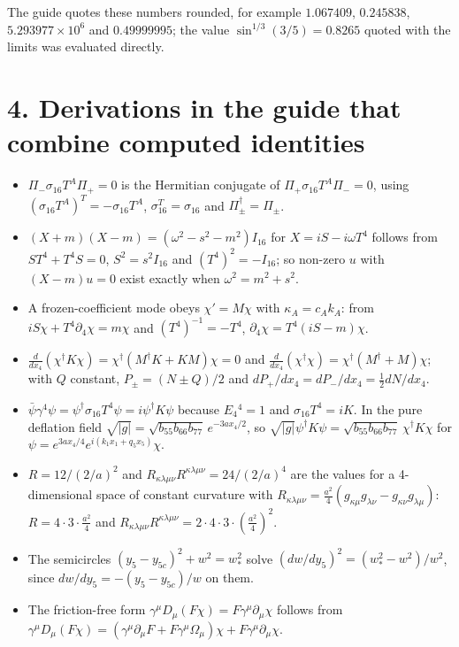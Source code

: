 \documentclass[10pt]{article}
\begin{document}
The guide quotes these numbers rounded, for example $1.067409$, $0.245838$, $5.293977\times10^6$ and $0.49999995$; the value $\sin^{1/3}(3/5) = 0.8265$ quoted with the limits was evaluated directly.


\section*{4. Derivations in the guide that combine computed identities}

\begin{itemize}
\item $\Pi_-\sigma_{16}T^A\Pi_+ = 0$ is the Hermitian conjugate of $\Pi_+\sigma_{16}T^A\Pi_- = 0$, using $(\sigma_{16}T^A)^T = -\sigma_{16}T^A$, $\sigma_{16}^T = \sigma_{16}$ and $\Pi_\pm^\dagger = \Pi_\pm$.
\item $(X + m)(X - m) = (\omega^2 - s^2 - m^2)I_{16}$ for $X = iS - i\omega T^4$ follows from $ST^4 + T^4S = 0$, $S^2 = s^2I_{16}$ and $(T^4)^2 = -I_{16}$; so non-zero $u$ with $(X - m)u = 0$ exist exactly when $\omega^2 = m^2 + s^2$.
\item A frozen-coefficient mode obeys $\chi' = M\chi$ with $\kappa_A = c_Ak_A$: from $iS\chi + T^4\partial_4\chi = m\chi$ and $(T^4)^{-1} = -T^4$, $\partial_4\chi = T^4(iS - m)\chi$.
\item $\frac{d}{dx_4}(\chi^\dagger K\chi) = \chi^\dagger(M^\dagger K + KM)\chi = 0$ and $\frac{d}{dx_4}(\chi^\dagger\chi) = \chi^\dagger(M^\dagger + M)\chi$; with $Q$ constant, $P_\pm = (N \pm Q)/2$ and $dP_+/dx_4 = dP_-/dx_4 = \frac12 dN/dx_4$.
\item $\bar\psi\gamma^4\psi = \psi^\dagger\sigma_{16}T^4\psi = i\psi^\dagger K\psi$ because $E_4{}^4 = 1$ and $\sigma_{16}T^4 = iK$. In the pure deflation field $\sqrt{\lvert g\rvert} = \sqrt{b_{55}b_{66}b_{77}}\,e^{-3ax_4/2}$, so $\sqrt{\lvert g\rvert}\psi^\dagger K\psi = \sqrt{b_{55}b_{66}b_{77}}\,\chi^\dagger K\chi$ for $\psi = e^{3ax_4/4}e^{i(k_1x_1 + q_5x_5)}\chi$.
\item $R = 12/(2/a)^2$ and $R_{\kappa\lambda\mu\nu}R^{\kappa\lambda\mu\nu} = 24/(2/a)^4$ are the values for a 4-dimensional space of constant curvature with $R_{\kappa\lambda\mu\nu} = \frac{a^2}{4}(g_{\kappa\mu}g_{\lambda\nu} - g_{\kappa\nu}g_{\lambda\mu})$: $R = 4\cdot3\cdot\frac{a^2}{4}$ and $R_{\kappa\lambda\mu\nu}R^{\kappa\lambda\mu\nu} = 2\cdot4\cdot3\cdot\left(\frac{a^2}{4}\right)^2$.
\item The semicircles $(y_5 - y_{5c})^2 + w^2 = w_*^2$ solve $(dw/dy_5)^2 = (w_*^2 - w^2)/w^2$, since $dw/dy_5 = -(y_5 - y_{5c})/w$ on them.
\item The friction-free form $\gamma^\mu D_\mu(F\chi) = F\gamma^\mu\partial_\mu\chi$ follows from $\gamma^\mu D_\mu(F\chi) = (\gamma^\mu\partial_\mu F + F\gamma^\mu\Omega_\mu)\chi + F\gamma^\mu\partial_\mu\chi$.
\end{itemize}
\end{document}
